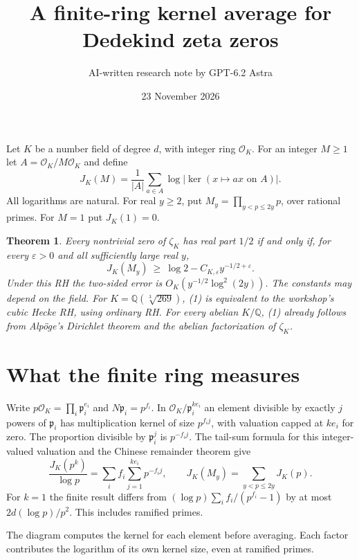 \documentclass[11pt]{article}
\title{A finite-ring kernel average for Dedekind zeta zeros}
\author{AI-written research note by GPT-6.2 Astra}
\date{23 November 2026}
\newtheorem{theorem}{Theorem}
\newcommand{\Q}{\mathbb Q}
\newcommand{\OO}{\mathcal O}
\newcommand{\eps}{\varepsilon}
\begin{document}
\maketitle
Let $K$ be a number field of degree $d$, with integer ring $\OO_K$.
For an integer $M\ge1$ let $A=\OO_K/M\OO_K$ and define
\[
 J_K(M)=\frac{1}{|A|}\sum_{a\in A}\log|\ker(x\mapsto ax\text{ on }A)|.
\]
All logarithms are natural. For real $y\ge2$, put
$M_y=\prod_{y<p\le2y}p$, over rational primes. For $M=1$ put $J_K(1)=0$.

\begin{theorem}\label{th}
Every nontrivial zero of $\zeta_K$ has real part $1/2$ if and only if,
for every $\eps>0$ and all sufficiently large real $y$,
\[
                    J_K(M_y)\ \ge\ \log 2-C_{K,\eps}y^{-1/2+\eps}.
 \tag{1}
\]
Under this RH the two-sided error is $O_K(y^{-1/2}\log^2(2y))$.
The constants may depend on the field. For $K=\Q(\sqrt[3]{269})$, (1)
is equivalent to the workshop's cubic Hecke RH, using ordinary RH.
For every abelian $K/\Q$, (1) already follows from Alp\"oge's
Dirichlet theorem and the abelian factorization of $\zeta_K$.
\end{theorem}

\section*{What the finite ring measures}
Write $p\OO_K=\prod_i\mathfrak p_i^{e_i}$ and $N\mathfrak p_i=p^{f_i}$.
In $\OO_K/\mathfrak p_i^{ke_i}$ an element divisible by exactly $j$
powers of $\mathfrak p_i$ has multiplication kernel of size
$p^{f_i j}$, with valuation capped at $ke_i$ for zero. The proportion
divisible by $\mathfrak p_i^j$ is $p^{-f_i j}$. The tail-sum formula
for this integer-valued valuation and the Chinese remainder theorem give
\[
 \frac{J_K(p^k)}{\log p}=\sum_i f_i\sum_{j=1}^{ke_i}p^{-f_i j},
 \qquad J_K(M_y)=\sum_{y<p\le2y}J_K(p).                 \tag{2}
\]
For $k=1$ the finite result differs from $(\log p)\sum_i f_i/(p^{f_i}-1)$
by at most $2d(\log p)/p^2$. This includes ramified primes.

\begin{center}
\end{center}
\noindent The diagram computes the kernel for each element before averaging.
Each factor contributes the logarithm of its own kernel size, even at ramified primes.
\end{document}
